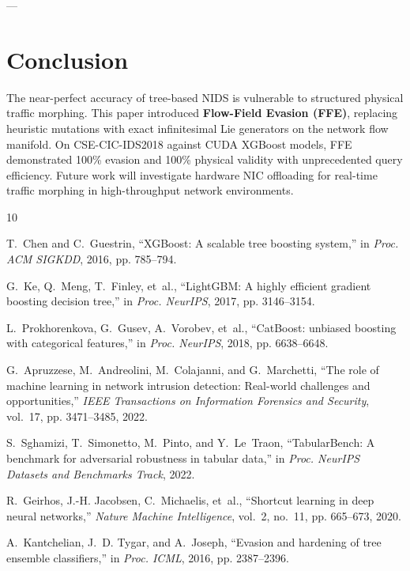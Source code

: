 \documentclass[10pt,journal,compsoc]{IEEEtran}
\begin{document}
---

\section{Conclusion}
The near-perfect accuracy of tree-based NIDS is vulnerable to structured physical traffic morphing. This paper introduced \textbf{Flow-Field Evasion (FFE)}, replacing heuristic mutations with exact infinitesimal Lie generators on the network flow manifold. On CSE-CIC-IDS2018 against CUDA XGBoost models, FFE demonstrated 100\% evasion and 100\% physical validity with unprecedented query efficiency. Future work will investigate hardware NIC offloading for real-time traffic morphing in high-throughput network environments.


\begin{thebibliography}{10}

T.~Chen and C.~Guestrin, ``XGBoost: A scalable tree boosting system,'' in \emph{Proc. ACM SIGKDD}, 2016, pp. 785--794.

G.~Ke, Q.~Meng, T.~Finley, et~al., ``LightGBM: A highly efficient gradient boosting decision tree,'' in \emph{Proc. NeurIPS}, 2017, pp. 3146--3154.

L.~Prokhorenkova, G.~Gusev, A.~Vorobev, et~al., ``CatBoost: unbiased boosting with categorical features,'' in \emph{Proc. NeurIPS}, 2018, pp. 6638--6648.

G.~Apruzzese, M.~Andreolini, M.~Colajanni, and G.~Marchetti, ``The role of machine learning in network intrusion detection: Real-world challenges and opportunities,'' \emph{IEEE Transactions on Information Forensics and Security}, vol.~17, pp. 3471--3485, 2022.

S.~Sghamizi, T.~Simonetto, M.~Pinto, and Y.~Le~Traon, ``TabularBench: A benchmark for adversarial robustness in tabular data,'' in \emph{Proc. NeurIPS Datasets and Benchmarks Track}, 2022.

R.~Geirhos, J.-H. Jacobsen, C.~Michaelis, et~al., ``Shortcut learning in deep neural networks,'' \emph{Nature Machine Intelligence}, vol.~2, no.~11, pp. 665--673, 2020.

A.~Kantchelian, J.~D. Tygar, and A.~Joseph, ``Evasion and hardening of tree ensemble classifiers,'' in \emph{Proc. ICML}, 2016, pp. 2387--2396.


\end{thebibliography}
\end{document}
